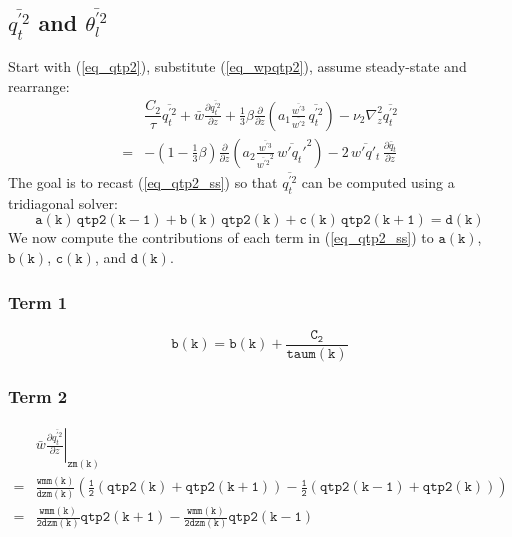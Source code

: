\documentclass[11pt,fleqn]{article}
\newcommand{\ptlder}[2]{\frac{\partial #1}{\partial #2}}
\begin{document}
\subsection{ $\overline{q_t^{'2}}$ and $\overline{\theta_l^{'2}}$ }

Start with (\ref{eq_qtp2}), substitute (\ref{eq_wpqtp2}), assume steady-state 
and rearrange:
%
\begin{equation}
\begin{split}
\label{eq_qtp2_ss}
& \dfrac{C_2}{\tau} \overline{q_t^{'2}}
+ \bar{w}\ptlder{\overline{q^{'2}_t}}{z}
+ \frac{1}{3} \beta
   \ptlder{}{z}
     \left( 
       a_1
       \frac{\overline{w^{'3}}}{\overline{w^{'2}}} \,
       \overline{q_t^{'2}}
     \right)
- \nu_2 \nabla_z^2 \overline{q_t^{'2}} \\
=& - \left( 1 - \frac{1}{3}\beta \right)
       \ptlder{}{z}
         \left( 
           a_2
           \frac{\overline{w^{'3}}}{\overline{w^{'2}}^2} \,
           \overline{w'q_t'}^2
         \right)
   - 2 \, \overline{w'q'_t} \, \ptlder{\bar{q}_t}{z} 
\end{split}
\end{equation}
%
The goal is to recast (\ref{eq_qtp2_ss}) so that $\overline{q_t^{'2}}$
can be computed using a tridiagonal solver:
%
\begin{equation}
\mathtt{ a(k) \, qtp2(k-1) + b(k) \, qtp2(k) + c(k) \, qtp2(k+1) = d(k) }
\end{equation}
%
We now compute the contributions of each term in (\ref{eq_qtp2_ss}) to
$\mathtt{a(k)}$, $\mathtt{b(k)}$, $\mathtt{c(k)}$, and $\mathtt{d(k)}$.

\subsubsection{Term 1}

\begin{equation}
\mathtt{ b(k) = b(k) + \frac{C_2}{taum(k)} }
\end{equation}

\subsubsection{Term 2}

\begin{equation}
\begin{split}
& \left. \bar{w}\ptlder{\overline{q^{'2}_t}}{z} \right|_{\mathtt{zm(k)}} \\
=& \mathtt{ \frac{wmm(k)}{dzm(k)}
   \left(
     \frac{1}{2} \left( qtp2(k)+qtp2(k+1) \right)
     - \frac{1}{2} \left( qtp2(k-1)+qtp2(k) \right)
   \right) } \\
=& \mathtt{ \frac{wmm(k)}{2 dzm(k)} qtp2(k+1) - \frac{wmm(k)}{2 dzm(k)} qtp2(k-1) }
\end{split}
\end{equation}
\end{document}
